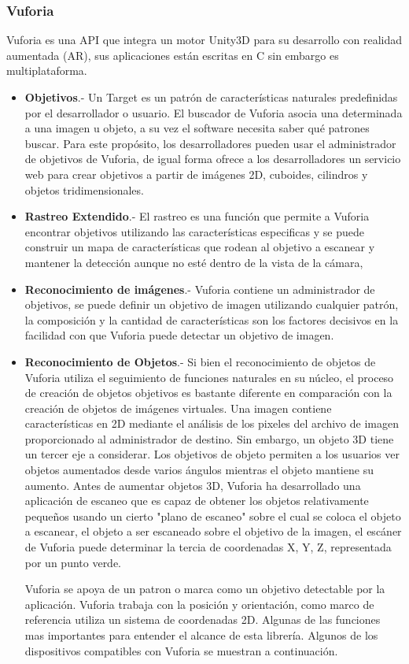 \subsubsection{Vuforia}
Vuforia es una API que integra un motor Unity3D para su desarrollo con realidad aumentada (AR), sus aplicaciones están escritas en C sin embargo es multiplataforma.\par
	\begin{itemize}
	
	\item \textbf{Objetivos}.- Un Target es un patrón de características naturales predefinidas por el desarrollador o usuario. El buscador de  Vuforia asocia una determinada a una imagen u objeto, a  su vez el software necesita saber qué patrones buscar. Para este propósito, los desarrolladores pueden usar el administrador de objetivos de Vuforia, de igual forma ofrece a los desarrolladores un servicio web para crear objetivos a partir de imágenes 2D, cuboides, cilindros y objetos tridimensionales.
	
	\item \textbf{Rastreo Extendido}.- El rastreo es una función que permite a Vuforia encontrar objetivos utilizando las características especificas y se  puede construir un mapa de características que rodean al objetivo a escanear y mantener la detección aunque no esté dentro de la vista de la cámara, 
	
	\item \textbf{Reconocimiento de imágenes}.- Vuforia contiene un administrador de objetivos, se puede definir un objetivo de imagen utilizando cualquier patrón, la composición y la cantidad de características son los factores decisivos en la facilidad con que Vuforia puede detectar un objetivo de imagen.
	
	\item \textbf{Reconocimiento de Objetos}.- Si bien el reconocimiento de objetos de Vuforia utiliza el seguimiento de funciones naturales en su núcleo, el proceso de creación de objetos objetivos es bastante diferente en comparación con la creación de objetos de imágenes virtuales. Una imagen contiene características en 2D mediante el análisis de los pixeles del archivo de imagen proporcionado al administrador de destino. Sin embargo, un objeto 3D tiene un tercer eje a considerar. Los objetivos de objeto permiten a los usuarios ver objetos aumentados desde varios ángulos mientras el objeto mantiene su aumento. Antes de aumentar objetos 3D, Vuforia ha desarrollado una aplicación de escaneo que es capaz de obtener los objetos relativamente pequeños usando un cierto "plano de escaneo" sobre el cual se coloca el objeto a escanear, el objeto a ser escaneado sobre el objetivo de la imagen, el escáner de Vuforia puede determinar la tercia de coordenadas X, Y, Z, representada por un punto verde.\par
	Vuforia se apoya de un patron o marca como un objetivo detectable por la aplicación. Vuforia trabaja con la posición y orientación, como marco de referencia utiliza un sistema de coordenadas 2D. Algunas de las funciones mas importantes para entender el alcance de esta librería\cite{B12}. 
	Algunos de los dispositivos compatibles con Vuforia se muestran a continuación.
\end{itemize}
